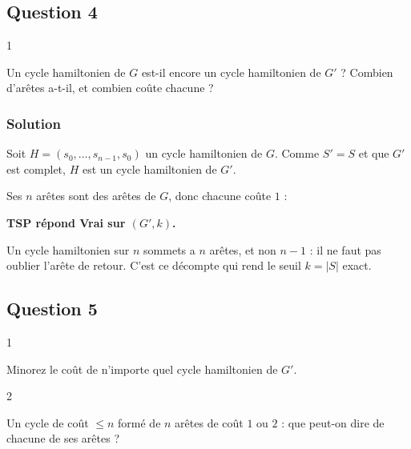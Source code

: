 \documentclass[11pt,a4paper]{article}
\newcommand{\equationajustee}[1]{%
  \sbox{\boiteequation}{$\displaystyle #1$}%
  \ifdim\wd\boiteequation>\linewidth
    \[\resizebox{\linewidth}{!}{\usebox{\boiteequation}}\]%
  \else
    \[#1\]%
  \fi}
\begin{document}
\hypertarget{question-4}{%
\subsection{Question 4}\label{question-4}}

\begin{indication}{1}

Un cycle hamiltonien de \(G\) est-il encore un cycle hamiltonien de \(G'\) ? Combien d'arêtes a-t-il, et combien coûte chacune ?

\end{indication}

\hypertarget{solution-3}{%
\subsubsection{Solution}\label{solution-3}}

Soit \(H=(s_0,\dots,s_{n-1},s_0)\) un cycle hamiltonien de \(G\). Comme \(S'=S\) et que \(G'\) est complet, \(H\) est un cycle hamiltonien de \(G'\).

Ses \(n\) arêtes sont des arêtes de \(G\), donc chacune coûte \(1\) :

\equationajustee{c(H)=n=k.}

\textbf{TSP répond Vrai sur \((G',k)\).}

\begin{piege}

Un cycle hamiltonien sur \(n\) sommets a \(n\) arêtes, et non \(n-1\) : il ne faut pas oublier l'arête de retour. C'est ce décompte qui rend le seuil \(k=|S|\) exact.

\end{piege}

\hypertarget{question-5}{%
\subsection{Question 5}\label{question-5}}

\begin{indication}{1}

Minorez le coût de n'importe quel cycle hamiltonien de \(G'\).

\end{indication}

\begin{indication}{2}

Un cycle de coût \(\le n\) formé de \(n\) arêtes de coût \(1\) ou \(2\) : que peut-on dire de chacune de ses arêtes ?

\end{indication}
\end{document}
